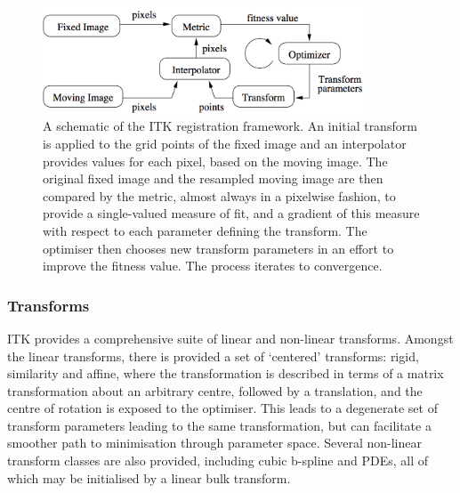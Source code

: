     \begin{figure}[htbp]
      \centering
      \includegraphics[width=0.85\textwidth]{Ch2/Figs/framework}
      \caption{A schematic of the ITK registration framework. An initial transform is applied to the grid points of the fixed image and an interpolator provides values for each pixel, based on the moving image. The original fixed image and the resampled moving image are then compared by the metric, almost always in a pixelwise fashion, to provide a single-valued measure of fit, and a gradient of this measure with respect to each parameter defining the transform. The optimiser then chooses new transform parameters in an effort to improve the fitness value. The process iterates to convergence.}
      \label{fig:framework}
    \end{figure}
    
    \subsubsection{Transforms} %
    \label{ssub:transforms}
      ITK provides a comprehensive suite of linear and non-linear transforms. Amongst the linear transforms, there is provided a set of `centered' transforms: rigid, similarity and affine, where the transformation is described in terms of a matrix transformation about an arbitrary centre, followed by a translation, and the centre of rotation is exposed to the optimiser. This leads to a degenerate set of transform parameters leading to the same transformation, but can facilitate a smoother path to minimisation through parameter space. Several non-linear transform classes are also provided, including cubic b-spline and PDEs, all of which may be initialised by a linear bulk transform.
    

